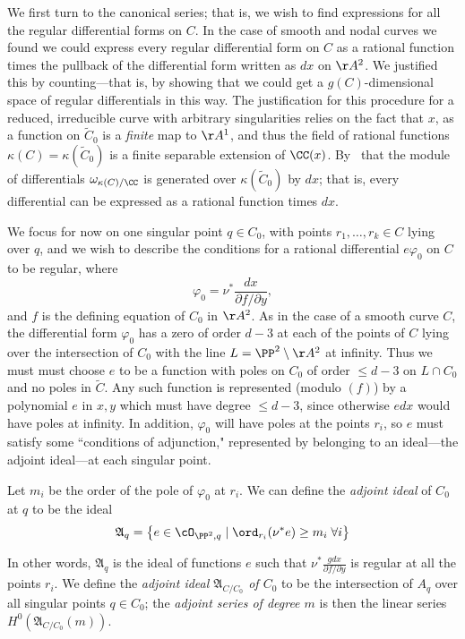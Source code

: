 We first turn to the canonical series; that is, we wish to find expressions for all the regular differential forms on $C$. In the case of smooth and nodal curves we found we could express every regular differential form
on $C$ as a rational function times the pullback of the differential form written as $dx$ on $\AA^2$. We justified this
by counting---that is, by showing that we could get a $g(C)$-dimensional space of regular differentials in this way. The justification for 
this procedure for a reduced, irreducible curve with arbitrary singularities relies on the fact that $x$, as a function on $\widetilde C_0$
is a \emph{finite} map to $\AA^1$, and thus the field of rational functions $\kappa(C) = \kappa(\widetilde C_0)$ is a finite
separable extension of $\CC(x)$. By~\cite[Section 16.5]{Eisenbud1995} that the module of differentials 
$\omega_{\kappa(C)/\CC}$ is generated over $\kappa(\widetilde C_0)$ by $dx$; that is, every differential can be expressed as a rational function
times $dx$. 

We focus for now on one singular point $q \in C_0$, with points $r_1,\dots,r_k \in C$ lying over $q$, and we wish to describe the conditions for a rational differential $e\varphi_0$ on $C$ to be regular, where
$$
\varphi_0 = \nu^* \frac{dx}{\partial f/\partial y},
$$
and $f$ is the defining equation of $C_0$ in $\AA^2$. As in the case of a smooth curve $C$, the differential
form $\varphi_0$ has a zero of order $d-3$ at each of the points of $C$ lying over the intersection of $C_0$ with the line  $L = \PP^2\setminus \AA^2$
at infinity. Thus we must must choose $e$ to be a function with poles on $C_0$ of order $\leq d-3$ on $L\cap C_0$ and no poles in $\widetilde C$. Any such function is represented (modulo $(f)$) by 
a polynomial $e$ in $x,y$ which must have degree $\leq d-3$, since otherwise $edx$ would have poles at infinity. In addition, $\varphi_0$ will have poles at the points $r_i$,
so $e$ must satisfy some ``conditions of adjunction," represented by belonging to an ideal---the adjoint ideal---at each singular point.

Let $m_i$ be the order of the pole of $\varphi_0$ at $r_i$. We can define the \emph{adjoint ideal} of $C_0$ at $q$ to be the ideal
$$
\mathfrak A_{q} = \left\{ e \in \cO_{\PP^2, q} \mid \ord_{r_i}(\nu^*e) \geq m_i \; \forall i \right\}
$$

In other words, $\mathfrak A_q$ is the ideal of functions $e$ such that $\nu^* \frac{gdx}{\partial f/\partial y}$ is regular at all the points $r_i$. We define the \emph{adjoint ideal $\mathfrak A_{C/C_0}$ of $C_0$} to be the intersection of $A_q$ over all singular points  $q \in C_0$; the \emph{adjoint series of degree $m$} is then the linear series $H^0(\mathfrak A_{C/C_0}(m))$. 

